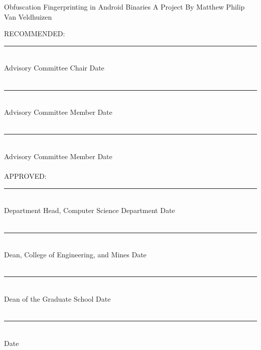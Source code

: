 \begin{center}
{\fontsize{50}{60}\selectfont Obfuscation Fingerprinting in Android Binaries}
\vfill
{\Large A Project}
\vfill
By Matthew Philip Van Veldhuizen
\vfill
\end{center}
RECOMMENDED:\\
\hspace*{4cm} \rule{10cm}{0.4pt}\\
\hspace*{4.5cm} {\scriptsize Advisory Committee Chair \hspace{5cm} Date}\\\\
\hspace*{4cm} \rule{10cm}{0.4pt}\\
\hspace*{4.5cm} {\scriptsize Advisory Committee Member \hspace{4.7cm} Date}\\\\
\hspace*{4cm} \rule{10cm}{0.4pt}\\
\hspace*{4.5cm} {\scriptsize Advisory Committee Member \hspace{4.7cm} Date}\\\\
APPROVED:\\
\hspace*{4cm} \rule{10cm}{0.4pt}\\
\hspace*{4.5cm} {\scriptsize Department Head, Computer Science Department \hspace{2.4cm} Date}\\\\
\hspace*{4cm} \rule{10cm}{0.4pt}\\
\hspace*{4.5cm} {\scriptsize Dean, College of Engineering, and Mines \hspace{3.4cm} Date}\\\\
\hspace*{4cm} \rule{10cm}{0.4pt}\\
\hspace*{4.5cm} {\scriptsize Dean of the Graduate School \hspace{4.8cm} Date}\\\\
\hspace*{4cm} \rule{10cm}{0.4pt}\\
\hspace*{4.5cm} {\scriptsize Date}
\thispagestyle{empty}